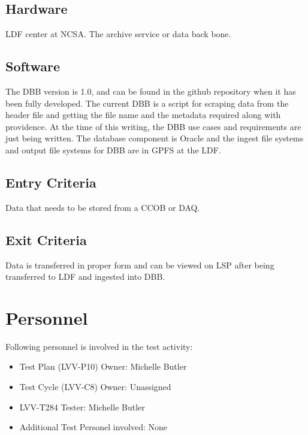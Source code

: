 \documentclass[DM,lsstdraft,STR,toc]{lsstdoc}
\begin{document}
\subsection{Hardware}
\label{sect:hwconf}

LDF center at NCSA.   The archive service or data back bone.

\subsection{Software}
\label{sect:swconf}

The DBB version is 1.0, and can be found in the github repository when it has been fully developed.   The current DBB is a script for scraping data from the header file and getting the file name and the metadata required along with providence.   At the time of this writing, the DBB use cases and requirements are just being written.    The database component is Oracle and the ingest file systems and output file systems for DBB are in GPFS at the LDF.  

\subsection{Entry Criteria}

Data that needs to be stored from a CCOB or DAQ.

\subsection{Exit Criteria}

Data is transferred in proper form and can be viewed on LSP after being transferred to LDF and ingested into DBB.  


\section{Personnel}
\label{sect:personnel}

Following personnel is involved in the test activity:

\begin{itemize}
\item Test Plan (LVV-P10) Owner: Michelle Butler
\item Test Cycle (LVV-C8) Owner: Unassigned
\item LVV-T284 Tester: Michelle Butler
\item Additional Test Personel involved: None 
\end{itemize}
\end{document}
